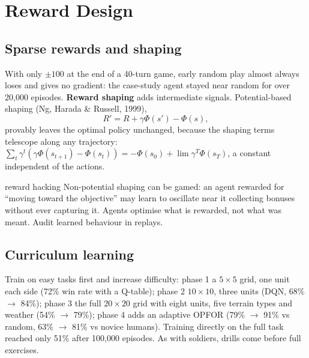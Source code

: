 \documentclass[11pt]{article}
\begin{document}
\section{Reward Design}
\subsection{Sparse rewards and shaping}
With only $\pm100$ at the end of a 40-turn game, early random play almost always loses and gives no gradient: the case-study agent stayed near random for over 20,000 episodes. \textbf{Reward shaping} adds intermediate signals. Potential-based shaping (Ng, Harada \& Russell, 1999),
\[R'=R+\gamma\Phi(s')-\Phi(s),\]
provably leaves the optimal policy unchanged, because the shaping terms telescope along any trajectory: $\sum_t\gamma^t(\gamma\Phi(s_{t+1})-\Phi(s_t))=-\Phi(s_0)+\lim\gamma^T\Phi(s_T)$, a constant independent of the actions.
\begin{pitfall}{reward hacking}
Non-potential shaping can be gamed: an agent rewarded for ``moving toward the objective'' may learn to oscillate near it collecting bonuses without ever capturing it. Agents optimise what is rewarded, not what was meant. Audit learned behaviour in replays.
\end{pitfall}

\subsection{Curriculum learning}
Train on easy tasks first and increase difficulty: phase 1 a $5\times5$ grid, one unit each side (72\% win rate with a Q-table); phase 2 $10\times10$, three units (DQN, 68\% $\to$ 84\%); phase 3 the full $20\times20$ grid with eight units, five terrain types and weather (54\% $\to$ 79\%); phase 4 adds an adaptive OPFOR (79\% $\to$ 91\% vs random, 63\% $\to$ 81\% vs novice humans). Training directly on the full task reached only 51\% after 100,000 episodes. As with soldiers, drills come before full exercises.
\end{document}
